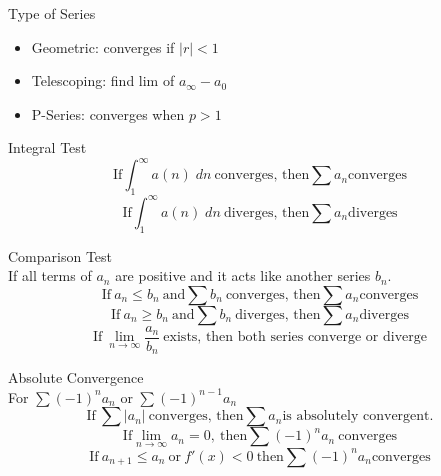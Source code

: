 \documentclass[12pt]{article}
\numberwithin{equation}{subsection}
\begin{document}
\begin{flushleft}
Type of Series
\begin{itemize}
\item Geometric: converges if $\mid r \mid <1$
\item Telescoping: find lim of $a_{\infty}-a_{0}$
\item P-Series: converges when $p>1$
\end{itemize}

Integral Test
\begin{equation}
\textrm{If} \int_{1}^{\infty}a(n)\;dn\ \textrm{converges, then}\sum a_{n} \textrm{converges}
\end{equation}
\begin{equation}
\textrm{If} \int_{1}^{\infty}a(n)\;dn\ \textrm{diverges, then}\sum a_{n} \textrm{diverges}
\end{equation}
\end{flushleft}
\newpage

Comparison Test\\
\hangindent=2cm If all terms of $a_{n}$ are positive and it acts like another series $b_{n}$.
\begin{equation}
\textrm{If}\ a_{n}\leq b_{n}\ \textrm{and} \sum b_{n}\ \textrm{converges, then} \sum a_{n} \textrm{converges}
\end{equation}
\begin{equation}
\textrm{If}\ a_{n}\geq b_{n}\ \textrm{and} \sum b_{n}\ \textrm{diverges, then} \sum a_{n} \textrm{diverges}
\end{equation}
\begin{equation}
\textrm{If}\ \lim_{n\rightarrow\infty} \frac{a_{n}}{b_{n}}\ \textrm{exists, then both series converge or diverge}
\end{equation}

Absolute Convergence\\
\hangindent=2cm For $\sum (-1)^{n}a_{n}$ or $\sum (-1)^{n-1}a_{n}$
\begin{equation}
\textrm{If}\ \sum \vert a_{n} \vert \ \textrm{converges, then} \sum a_{n} \textrm{is absolutely convergent.}
\end{equation}
\begin{equation}
\textrm{If} \lim_{n\rightarrow \infty}a_{n}=0,\ \textrm{then}\sum (-1)^{n}a_{n}\ \textrm{converges}
\end{equation}
\begin{equation}
\textrm{If}\ a_{n+1}\leq a_{n}\ \textrm{or}\ f'(x)<0\ \textrm{then} \sum (-1)^{n}a_{n} \textrm{converges}
\end{equation}
\end{document}
